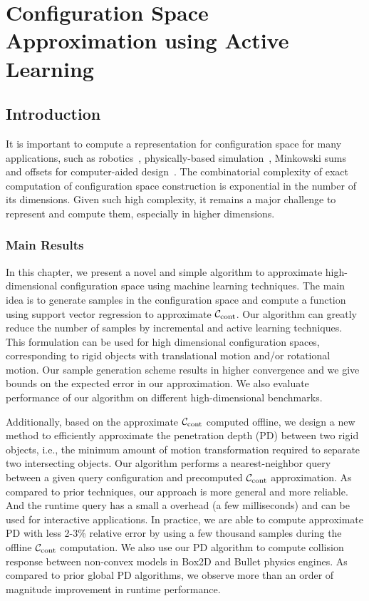 \chapter{Configuration Space Approximation \mbox{using} Active Learning} 
\label{chp:APD}

\section{Introduction}
It is important to compute a representation for configuration space for many applications, such as robotics~\cite{LPT:SpatialPlanning:1983}, physically-based simulation~\cite{Je:2012:PRP}, Minkowski sums~\cite{Varadhan:2006:TPA} and offsets for computer-aided design~\cite{Choi:1997:CAD}. The combinatorial complexity of exact computation of configuration space construction is exponential in the number of its dimensions. Given such high complexity, it remains a major challenge to represent and compute them, especially in higher dimensions.

\subsection{Main Results}
In this chapter, we present a novel and simple algorithm to approximate high-dimensional configuration space using machine learning techniques. The main idea is to generate samples in the configuration space and compute a function using support vector regression to approximate $\mathcal C_\text{cont}$. Our algorithm can greatly reduce the number of samples by incremental and active learning techniques.
This formulation can be used for high dimensional configuration spaces, corresponding to rigid objects with translational motion and/or rotational motion. Our sample generation scheme results in higher convergence and we give bounds on the expected error in our approximation. We also evaluate performance of our algorithm on different high-dimensional benchmarks.

Additionally, based on the approximate $\mathcal C_\text{cont}$ computed offline, we design a new method to efficiently approximate the penetration depth (PD) between two rigid objects, i.e., the minimum amount of motion transformation required to separate two intersecting objects. Our algorithm performs a nearest-neighbor query between a given query configuration and precomputed $\mathcal C_\text{cont}$ approximation. As compared to prior techniques, our approach is more general and more reliable. And the runtime query has a small a overhead (a few milliseconds) and can be used for interactive applications. In practice, we are able to compute approximate PD with less 2-3\% relative error by using a few thousand samples during the offline $\mathcal C_\text{cont}$ computation. We also use our PD algorithm to compute collision response between non-convex models in Box2D and Bullet physics engines. As compared to prior global PD algorithms, we observe more than an order of magnitude improvement in runtime performance.



